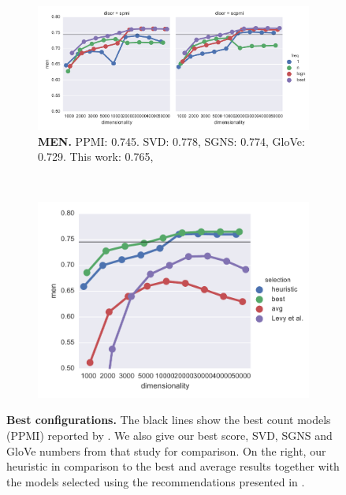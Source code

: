 \begin{figure}
  \begin{subfigure}[t]{0.6\textwidth}
    \includegraphics[width=\textwidth]{supplement/figures/men-best}
    \caption{\scriptsize \textbf{MEN.}
      PPMI: 0.745.
      SVD: 0.778,
      SGNS: 0.774,
      GloVe: 0.729.
      This work: 0.765,
    }
    \label{fig:best-men}
  \end{subfigure}
  ~
  \begin{subfigure}[t]{0.37\textwidth}
    \includegraphics[width=\textwidth]{supplement/figures/men-global-best}
    \caption{}
    \label{fig:global-best-men}
  \end{subfigure}

  \caption{\small\textbf{Best configurations.} The black lines show the best count models (PPMI) reported by \protect{}. We also give our best score, SVD, SGNS and GloVe numbers from that study for comparison. On the right, our heuristic in comparison to the best and average results together with the models selected using the recommendations presented in \protect{}.}
  \label{fig:best}
\end{figure}


